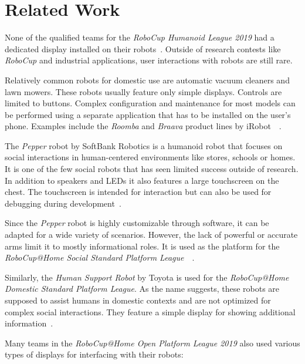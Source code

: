 \chapter{Related Work}
\label{related-work}

None of the qualified teams for the \textit{RoboCup Humanoid League 2019} had a dedicated display
installed on their robots~\cite{robocup-humanoid-teams}. Outside of research contests like
\textit{RoboCup} and industrial applications, user interactions with robots are still rare.
\bigbreak

Relatively common robots for domestic use are automatic vacuum cleaners and lawn mowers. These robots
usually feature only simple displays. Controls are limited to buttons. Complex configuration and
maintenance for most models can be performed using a separate application that has to be installed on
the user's phone. Examples include the \textit{Roomba} and \textit{Braava} product lines by iRobot~\
\cite{irobot-website}.

The \textit{Pepper} robot by SoftBank Robotics is a humanoid robot that focuses on social interactions
in human-centered environments like stores, schools or homes. It is one of the few social robots that
has seen limited success outside of research. In addition to speakers and LEDs it also features a
large touchscreen on the chest. The touchscreen is intended for interaction but can also be used for
debugging during development~\cite{pepper-robot}.

Since the \textit{Pepper} robot is highly customizable through software, it can be adapted for a wide
variety of scenarios. However, the lack of powerful or accurate arms limit it to mostly informational
roles. It is used as the platform for the \textit{RoboCup@Home Social Standard Platform League}~\
\cite{pepper-robot}.

Similarly, the \textit{Human Support Robot} by Toyota is used for the \textit{RoboCup@Home Domestic
Standard Platform League}. As the name suggests, these robots are supposed to assist humans in
domestic contexts and are not optimized for complex social interactions. They feature a simple
display for showing additional information~\cite{human-support-robot}.

Many teams in the \textit{RoboCup@Home Open Platform League 2019} also used various types of displays
for interfacing with their robots:

